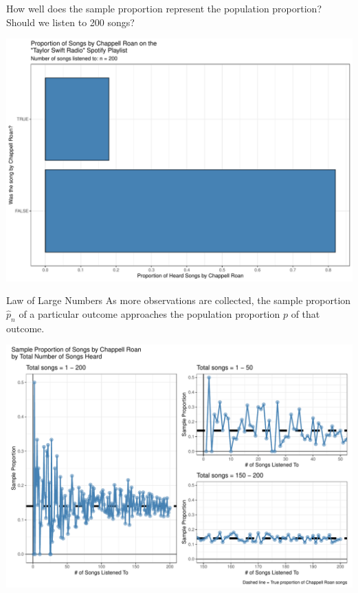 \documentclass[
  ignorenonframetext,
]{beamer}
\begin{document}
\begin{frame}{How well does the sample proportion represent the
population proportion?}
\label{how-well-does-the-sample-proportion-represent-the-population-proportion-3}
Should we listen to 200 songs?

\includegraphics{class09_files/figure-beamer/unnamed-chunk-10-1.pdf}
\end{frame}

\begin{frame}{Law of Large Numbers}
\label{law-of-large-numbers}
As more observations are collected, the sample proportion \(\hat{p}_n\)
of a particular outcome approaches the population proportion \(p\) of
that outcome.

\includegraphics{class09_files/figure-beamer/unnamed-chunk-11-1.pdf}
\end{frame}
\end{document}
